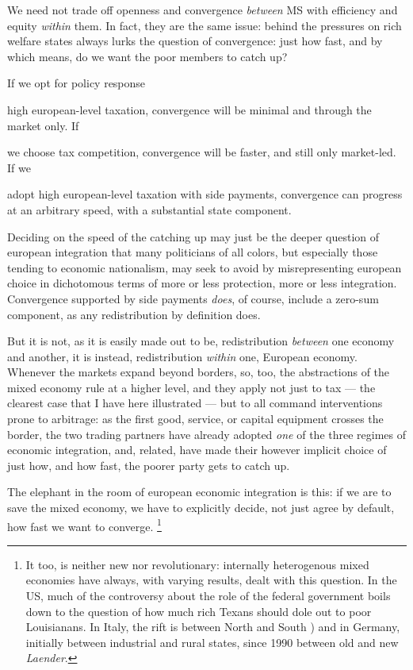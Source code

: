 
We need not trade off openness and convergence \emph{between} \gls{MS} with efficiency and equity \emph{within} them.
In fact, they are the same issue:
behind the pressures on rich welfare states always lurks the question of convergence:
just how fast, and by which means, do we want the poor members to catch up?

If we opt for policy response \begin{inparaenum}
	\item high european-level taxation, convergence will be minimal and through the market only.
If \item we choose tax competition, convergence will be faster, and still only market-led.
If we \item adopt high european-level taxation with side payments, convergence can progress at an arbitrary speed, with a substantial state component.
\end{inparaenum}

Deciding on the speed of the catching up may just be the deeper question of european integration that many politicians of all colors, but especially those tending to economic nationalism, may seek to avoid by misrepresenting european choice in dichotomous terms of more or less protection, more or less integration.
Convergence supported by side payments \emph{does}, of course, include a zero-sum component, as any redistribution by definition does.

But it is not, as it is easily made out to be, redistribution \emph{between} one economy and another, it is instead, redistribution \emph{within} one, European economy.
Whenever the markets expand beyond borders, so, too, the abstractions of the mixed economy rule at a higher level, and they apply not just to tax --- the clearest case that I have here illustrated --- but to all command interventions prone to arbitrage:
as the first good, service, or capital equipment crosses the border, the two trading partners have already adopted \emph{one} of the three regimes of economic integration, and, related, have made their however implicit choice of just how, and how fast, the poorer party gets to catch up.

The elephant in the room of european economic integration is this:
if we are to save the mixed economy, we have to explicitly decide, not just agree by default, how fast we want to converge.
\footnote{
	It too, is neither new nor revolutionary:
	internally heterogenous mixed economies have always, with varying results, dealt with this question.
	In the US, much of the controversy about the role of the federal government boils down to the question of how much rich Texans should dole out to poor Louisianans.
	In Italy, the rift is between North and South \citep[for example,][]{PutnamLeonardi-1993-aa}) and in Germany, initially between industrial and rural states, since 1990 between old and new \emph{Laender}.
}

